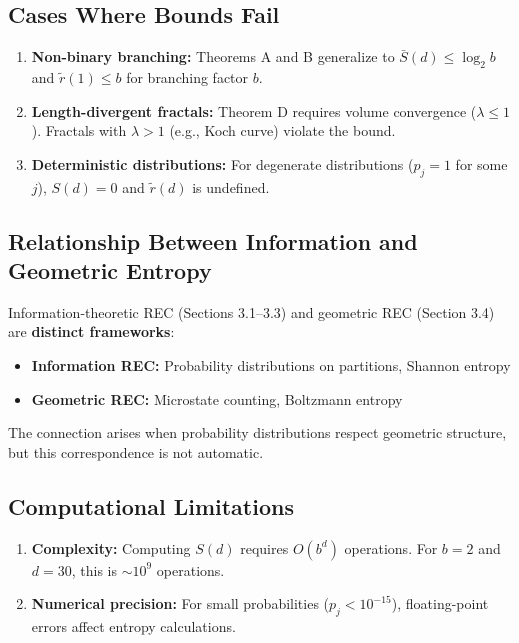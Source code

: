 \documentclass[11pt,a4paper]{article}
\theoremstyle{definition}
\theoremstyle{remark}
\newcommand{\Sbar}{\bar{S}}
\newcommand{\rtilde}{\tilde{r}}
\begin{document}
\subsection{Cases Where Bounds Fail}

\begin{enumerate}
    \item \textbf{Non-binary branching:} Theorems A and B generalize to $\Sbar(d) \leq \log_2 b$ and $\rtilde(1) \leq b$ for branching factor $b$.
    
    \item \textbf{Length-divergent fractals:} Theorem D requires volume convergence ($\lambda \leq 1$). Fractals with $\lambda > 1$ (e.g., Koch curve) violate the bound.
    
    \item \textbf{Deterministic distributions:} For degenerate distributions ($p_j = 1$ for some $j$), $S(d) = 0$ and $\rtilde(d)$ is undefined.
\end{enumerate}

\subsection{Relationship Between Information and Geometric Entropy}

Information-theoretic REC (Sections 3.1--3.3) and geometric REC (Section 3.4) are \textbf{distinct frameworks}:

\begin{itemize}
    \item \textbf{Information REC:} Probability distributions on partitions, Shannon entropy
    \item \textbf{Geometric REC:} Microstate counting, Boltzmann entropy
\end{itemize}

The connection arises when probability distributions respect geometric structure, but this correspondence is not automatic.

\subsection{Computational Limitations}

\begin{enumerate}
    \item \textbf{Complexity:} Computing $S(d)$ requires $O(b^d)$ operations. For $b = 2$ and $d = 30$, this is $\sim 10^9$ operations.
    
    \item \textbf{Numerical precision:} For small probabilities ($p_j < 10^{-15}$), floating-point errors affect entropy calculations.
\end{enumerate}
\end{document}
